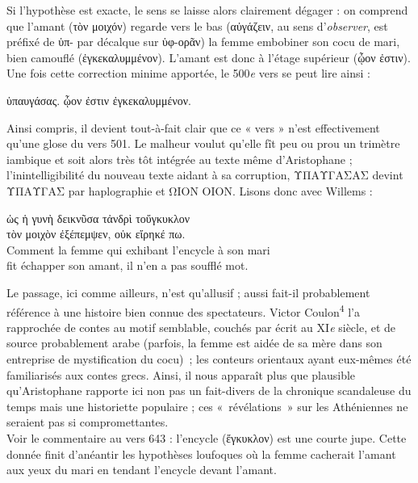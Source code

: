 \documentclass[12pt]{book}%
\newcommand{\italique}[1]{\textit{#1}}%
\newcommand{\citComm}[1]{\begin{quoting}[vskip=0pt] #1 \end{quoting}}%
\newcommand{\nieme}[1]{#1\italique{e}}%
\newcommand{\francais}[1]{{\policeFr #1}}%
\newcommand{\marqueur}[1]{\textsuperscript{#1}}%
\newenvironment{groupe}{%
\pstart%
\ledgroup%
}{%
\pend %
}%
\begin{document}
\begin{pages}
\begin{Leftside}
\begin{groupe}
{{Si l'hypothèse est exacte, le sens se laisse alors clairement dégager : on comprend que l'amant (τὸν μοιχόν) regarde vers le bas (αὐγάζειν, au sens d'\italique{observer}, est préfixé de ὑπ- par décalque sur ὑφ-ορᾶν) la femme embobiner son cocu de mari, bien camouflé (ἐγκεκαλυμμένον). L'amant est donc à l'étage supérieur (ᾦον ἐστιν).
Une fois cette correction minime apportée, le \nieme{500} vers se peut lire ainsi : 
\citComm{[τὸν μοιχόν·] ὑπαυγάσας. ᾦον ἐστιν ἐγκεκαλυμμένον.}
Ainsi compris, il devient tout-à-fait clair que ce « vers » n'est effectivement qu'une glose du vers 501. Le malheur voulut qu'elle fît peu ou prou un trimètre iambique et soit alors très tôt intégrée au texte même d'Aristophane ; l'inintelligibilité du nouveau texte aidant à sa corruption, ΥΠΑΥΓΑΣΑΣ devint ΥΠΑΥΓΑΣ par haplographie et ΩΙΟΝ ΟΙΟΝ.
Lisons donc avec Willems : %
\citComm{ὡς ἡ γυνὴ δεικνῦσα τἀνδρὶ τοὔγκυκλον\\
τὸν μοιχὸν ἐξέπεμψεν, οὐκ εἴρηκέ πω.\\
\francais{Comment la femme qui exhibant l'encycle à son mari\\
fit échapper son amant, il n'en a pas soufflé mot.}}%
Le passage, ici comme ailleurs, n'est qu'allusif ; aussi fait-il probablement référence à une histoire bien connue des spectateurs. Victor Coulon\marqueur{4} l'a rapprochée de contes au motif semblable, couchés par écrit au \nieme{XI} siècle, et de source probablement arabe (parfois, la femme est aidée de sa mère dans son entreprise de mystification du cocu)~; les conteurs orientaux ayant eux-mêmes été familiarisés aux contes grecs. Ainsi, il nous apparaît plus que plausible qu'Aristophane rapporte ici non pas un fait-divers de la chronique scandaleuse du temps mais une historiette populaire ; ces «~révélations~» sur les Athéniennes ne seraient pas si compromettantes.\\%
Voir le commentaire au vers 643 : l'encycle (ἔγκυκλον) est une courte jupe. Cette donnée finit d'anéantir les hypothèses loufoques %
où la femme cacherait l'amant aux yeux du mari en tendant l'encycle devant l'amant.
}}
\end{groupe}
\end{Leftside}
\end{pages}
\end{document}
